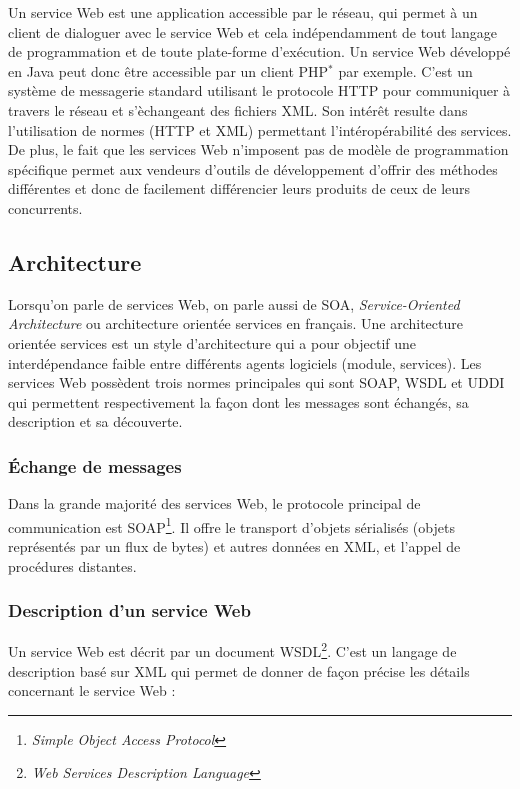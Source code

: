 Un service Web est une application accessible par le r\'eseau, qui permet \`a un client de dialoguer avec le service Web et cela ind\'ependamment de tout langage de programmation et de toute plate-forme d'ex\'ecution.
Un service Web d\'evelopp\'e en Java peut donc \^etre accessible par un client PHP$^*$ par exemple.
C'est un syst\`eme de messagerie standard utilisant le protocole HTTP pour communiquer \`a travers le r\'eseau et s'\`echangeant des fichiers XML.
Son int\'er\^et resulte dans l'utilisation de normes (HTTP et XML) permettant l'int\'erop\'erabilit\'e des services.
De plus, le fait que les services Web n'imposent pas de mod\`ele de programmation sp\'ecifique permet aux vendeurs d'outils de d\'eveloppement d'offrir des m\'ethodes diff\'erentes et donc de facilement diff\'erencier leurs produits de ceux de leurs concurrents.

\subsection{Architecture}

Lorsqu'on parle de services Web, on parle aussi de SOA, \textit{Service-Oriented Architecture} ou architecture orient\'ee services en fran\c{c}ais.
Une architecture orient\'ee services est un style d'architecture qui a pour objectif une interd\'ependance faible entre diff\'erents agents logiciels (module, services).
Les services Web poss\`edent trois normes principales qui sont SOAP, WSDL et UDDI qui permettent respectivement la fa\c{c}on dont les messages sont \'echang\'es, sa description et sa d\'ecouverte.

\subsubsection{\'Echange de messages}

Dans la grande majorit\'e des services Web, le protocole principal de communication est SOAP\protect\footnote{\textit{Simple Object Access Protocol}}.
Il offre le transport d'objets s\'erialis\'es (objets repr\'esent\'es par un flux de bytes) et autres donn\'ees en XML, et l'appel de proc\'edures distantes.

\subsubsection{Description d'un service Web}

Un service Web est d\'ecrit par un document WSDL\protect\footnote{\textit{Web Services Description Language}}.
C'est un langage de description bas\'e sur XML qui permet de donner de fa\c{c}on pr\'ecise les d\'etails concernant le service Web :

